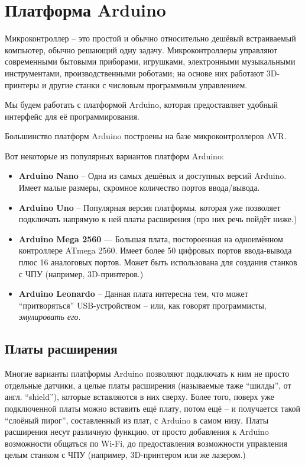 \documentclass[../sparc.tex]{subfiles}
\begin{document}
\section{Платформа Arduino}


Микроконтроллер -- это простой и обычно относительно дешёвый встраиваемый
компьютер, обычно решающий одну задачу.  Микроконтроллеры управляют современными
бытовыми приборами, игрушками, электронными музыкальными инструментами,
производственными роботами; на основе них работают 3D-принтеры и другие станки с
числовым программным управлением.

Мы будем работать с платформой Arduino, которая предоставляет удобный интерфейс
для её программирования.

Большинство платформ Arduino построены на базе микроконтроллеров AVR.

Вот некоторые из популярных вариантов платформ Arduino:
\begin{itemize}
\item \textbf{Arduino Nano} -- Одна из самых дешёвых и доступных версий Arduino.
  Имеет малые размеры, скромное количество портов ввода/вывода.
\item \textbf{Arduino Uno} -- Популярная версия платформы, которая уже позволяет
  подключать напрямую к ней платы расширения (про них речь пойдёт ниже.)
\item \textbf{Arduino Mega 2560} --- Большая плата, постороенная на одноимённом
  контроллере ATmega 2560.  Имеет более 50 цифровых портов ввода-вывода плюс 16
  аналоговых портов.  Может быть использована для создания станков с \gls{ЧПУ}
  (например, 3D-принтеров.)
\item \textbf{Arduino Leonardo} -- Данная плата интересна тем, что может
  ``притворяться'' USB-устройством -- или, как говорят программисты,
  \emph{эмулировать его}.
\end{itemize}

\subsection{Платы расширения}

Многие варианты платформы Arduino позволяют подключать к ним не просто отдельные
датчики, а целые платы расширения (называемые таже ``шилды'', от
англ. ``shield''), которые вставляются в них сверху.  Более того, поверх уже
подключенной платы можно вставить ещё плату, потом ещё -- и получается такой
``слоёный пирог'', составленный из плат, с Arduino в самом низу.  Платы
расширения несут различную функцию, от просто добавления к Arduino возможности
общаться по Wi-Fi, до предоставления возможности управления целым станком с
\gls{ЧПУ} (например, 3D-принтером или же лазером.)
\end{document}
